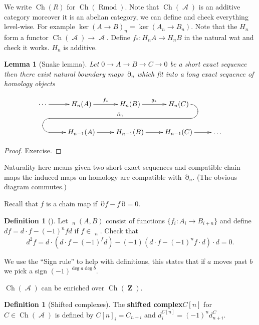 \documentclass[10pt,]{book}
\newcommand{\terminology}[1]{\textbf{#1}}
\theoremstyle{plain}
\newtheorem{lemma}[theorem]{Lemma}
\theoremstyle{definition}
\newtheorem{definition}[theorem]{Definition}
\numberwithin{equation}{section}
\renewenvironment{figure}%
{\begin{mbxfigure}\setcounter{mbxfigure}{\value{theorem}}\stepcounter{theorem}}%
{\end{mbxfigure}}
\DeclareMathOperator{\cHom}{\underline{Hom}}
\DeclareMathOperator{\Ch}{Ch}
\DeclareMathOperator{\ZZ}{\mathbf{Z}}
\DeclareMathOperator{\Rmod}{R\text{mod}}
\DeclareMathOperator{\cA}{\mathcal{A}}
\DeclareMathOperator{\dd}{\partial}
\begin{document}
          We write \(\Ch(R)\) for \(\Ch(\Rmod)\).
          Note that \(\Ch(\cA)\) is an additive category moreover it is an abelian category, we can define and check everything level-wise.
          For example \(\ker(A\to B)_n = \ker(A_n\to B_n)\).
          Note that the \(H_n\) form a functor \(\Ch(\cA)\to \cA\).
          Define \(f_*\colon H_n A \to H_n B\) in the natural wat and check it works.
          \(H_n\) is additive.
\begin{lemma}[Snake lemma]\label{lemma-snake}
Let \(0\to A \to B \to C \to 0\) be a short exact sequence then there exist natural boundary maps \(\dd_n\) which fit into a long exact sequence of homology objects
            \begin{figure}
\centering
\[
                \xymatrix{ \cdots\ar[r] & H_n(A) \ar[r]^{f_*}&
                H_n(B) \ar[r]^{g_*} & H_n(C)\ar `r[d] `[l]
                `[llld]_{\dd_n} `[dll] [dll]\\
                & H_{n-1}(A) \ar[r] & H_{n-1}(B)
                \ar[r] & H_{n-1}(C)\ar[r] & {\dots} }
              \]\end{figure}
\end{lemma}
\begin{proof}
Exercise.\end{proof}
\par
Naturality here means given two short exact sequences and compatible chain maps the induced maps on homology are compatible with \(\dd_n\).
          (The obvious diagram commutes.)
\par
Recall that \(f\) is a chain map if \(\dd f - f\dd = 0\).%
\begin{definition}[]\label{definition-10}
Let \(\cHom_n(A,B)\) consist of functions \(\{f_i \colon A_i \to B_{i+n}\} \) and define \(df = d\cdot f - (-1)^n fd\) if \(f\in\cHom_n\).
            Check that \[d^2 f = d\cdot (d\cdot f - (-1)^fd ) - (-1) (d\cdot f - (-1)^n f\cdot d)\cdot d = 0.\]\end{definition}
\par
We use the ``Sign rule'' to help with definitions, this states that if \(a\) moves past \(b\) we pick a sign \((-1)^{\deg a\deg b}\).%
\par
\(\Ch(\cA)\) can be enriched over \(\Ch(\ZZ)\).%
\begin{definition}[Shifted complexes]\label{definition-11}
The \terminology{shifted complex}\(C[n]\) for \(C\in \Ch(\cA)\) is defined by \(C[n]_i = C_{n+i}\) and \(d_i^{C[n]} = (-1)^n d_{n+i}^C\).\end{definition}
\end{document}
